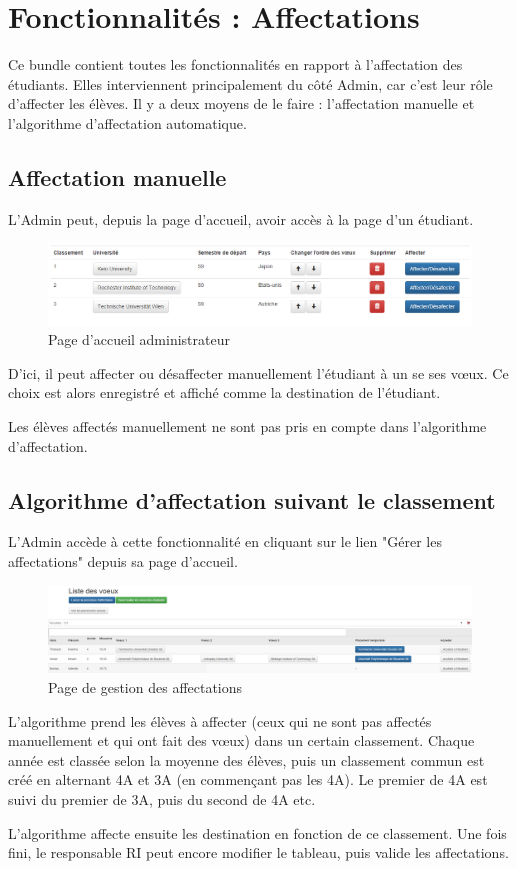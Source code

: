 \chapter{Fonctionnalités : Affectations}

Ce bundle contient toutes les fonctionnalités en rapport à l'affectation des étudiants.
Elles interviennent principalement du côté Admin, car c'est leur rôle d'affecter les élèves. Il y a deux moyens de le faire : l'affectation manuelle et l'algorithme d'affectation automatique.

\section{Affectation manuelle}

L'Admin peut, depuis la page d'accueil, avoir accès à la page d'un étudiant. 
 \bigbreak
 \begin{figure}[H]
	\centering
 \includegraphics[scale=0.5]{images/voeux_etud_vupar_admin.PNG}
	\caption{Page d'accueil administrateur}
	\label{gm}
\end{figure}
 
\bigbreak
D'ici, il peut affecter ou désaffecter manuellement l'étudiant à un se ses vœux.
Ce choix est alors enregistré et affiché comme la destination de l'étudiant.

Les élèves affectés manuellement ne sont pas pris en compte dans l'algorithme d'affectation.

\section{Algorithme d'affectation suivant le classement}

L'Admin accède à cette fonctionnalité en cliquant sur le lien "Gérer les affectations" depuis sa page d'accueil.
\bigbreak
\begin{figure}[H]
	\centering
	\includegraphics[scale=0.22]{images/Liste_de_voeux_admin.PNG}
	\caption{Page de gestion des affectations}
	\label{ga}
\end{figure}
\bigbreak
L'algorithme prend les élèves à affecter (ceux qui ne sont pas affectés manuellement et qui ont fait des vœux) dans un certain classement. Chaque année est classée selon la moyenne des élèves, puis un classement commun est créé en alternant 4A et 3A (en commençant pas les 4A). Le premier de 4A est suivi du premier de 3A, puis du second de 4A etc.

L'algorithme affecte ensuite les destination en fonction de ce classement.
Une fois fini, le responsable RI peut encore modifier le tableau, puis valide les affectations.

